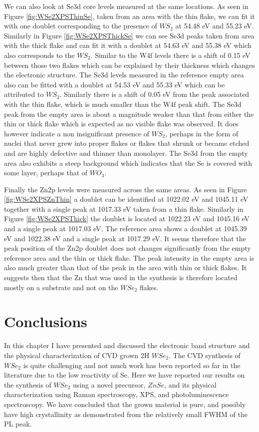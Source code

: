 We can also look at Se3d core levels measured at the same locations. As seen in Figure \ref{fig:WSe2XPSThinSe}, taken from an area with the thin flake, we can fit it with one doublet corresponding to the presence of $WS_2$ at 54.48 eV and 55.23 eV. Similarly in Figure \ref{fig:WSe2XPSThickSe} we can see Se3d peaks taken from area with the thick flake and can fit it with a doublet at 54.63 eV and 55.38 eV which also corresponds to the $WS_2$. Similar to the W4f levels there is a shift of 0.15 eV between those two flakes which can be explained by their thickness which changes the electronic structure. The Se3d levels measured in the reference empty area also can be fitted with a doublet at 54.53 eV and 55.33 eV which can be attributed to $WS_2$. Similarly there is a shift of 0.05 eV from the peak associated with the thin flake, which is much smaller than the W4f peak shift. The Se3d peak from the empty area is about a magnitude weaker than that from either the thin or thick flake which is expected as no visible flake was observed. It does however indicate a non insignificant presence of $WS_2$, perhaps in the form of nuclei that never grew into proper flakes or flakes that shrunk or became etched and are highly defective and thinner than monolayer. The Se3d from the empty area also exhibits a steep background which indicates that the Se is covered with some layer, perhaps that of $WO_3$. 

Finally the Zn2p levels were measured across the same areas. As seen in Figure \ref{fig:WSe2XPSZnThin} a doublet can be identified at 1022.02 eV and 1045.11 eV together with a single peak at 1017.33 eV taken from a thin flake. Similarly in Figure \ref{fig:WSe2XPSThick} the doublet is located at 1022.23 eV and 1045.16 eV and a single peak at 1017.03 eV. The reference area shows a doublet at 1045.39 eV and 1022.38 eV and a single peak at 1017.29 eV. It seems therefore that the peak position of the Zn2p doublet does not changes significantly from the empty reference area and the thin or thick flake. The peak intensity in the empty area is also much greater than that of the peak in the area with thin or thick flakes. It suggests then that the Zn that was used in the synthesis is therefore located mostly on a substrate and not on the $WSe_2$ flakes.

\section{Conclusions}

In this chapter I have presented and discussed the electronic band structure and the physical characterization of CVD grown 2H $WSe_2$.
The CVD synthesis of $WSe_2$ is quite challenging and not much work has been reported so far in the literature due to the low reactivity of Se. Here we have reported our results on the synthesis of $WSe_2$ using a novel precursor, $ZnSe$, and its physical characterization using Raman spectroscopy, XPS, and photoluminescence spectroscopy. We have concluded that the grown material is pure, and possibly have high crystallinity as demonstrated from the relatively small FWHM of the PL peak.